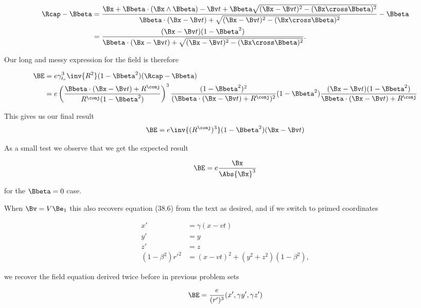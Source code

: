 \begin{align*}
\Rcap - \Bbeta &= 
\frac{\Bx + \Bbeta \cdot (\Bx \wedge \Bbeta) - \Bv t + \Bbeta \sqrt{ (\Bx - \Bv t)^2 - (\Bx \cross \Bbeta)^2 }}{ 
\Bbeta \cdot (\Bx - \Bv t) + \sqrt{ (\Bx - \Bv t)^2 - (\Bx \cross \Bbeta)^2 } 
} - \Bbeta \\
&=
\frac{(\Bx - \Bv t)(1 -\Bbeta^2)}{
\Bbeta \cdot (\Bx - \Bv t) + \sqrt{ (\Bx - \Bv t)^2 - (\Bx \cross \Bbeta)^2 } 
}.
\end{align*}

Our long and messy expression for the field is therefore

\begin{align*}
\BE &=
e \gamma_{t_r}^3 \inv{R^2} (1 - \Bbeta^2)(\Rcap - \Bbeta) \\
&=
e 
\left( 
\frac{\Bbeta \cdot (\Bx - \Bv t) + R^\conj}{R^\conj(1 - \Bbeta^2)}
\right)^3
\frac{(1 - \Bbeta^2)^2 }{ (\Bbeta \cdot (\Bx - \Bv t) + R^\conj)^2 } 
(1 -\Bbeta^2)
\frac{(\Bx - \Bv t)(1 -\Bbeta^2)}{
\Bbeta \cdot (\Bx - \Bv t) + R^\conj
} \\
\end{align*}

This gives us our final result
\begin{equation}\label{eqn:relElectroDynProblemSet5:980}
\BE =
e \inv{(R^\conj)^3}
(1 -\Bbeta^2)
(\Bx - \Bv t)
\end{equation}

As a small test we observe that we get the expected result

\begin{equation}\label{eqn:relElectroDynProblemSet5:820}
\BE = e \frac{\Bx}{\Abs{\Bx}^3}
\end{equation}

for the $\Bbeta = 0$ case.

When $\Bv = V \Be_1$ this also recovers equation (38.6) from the text as desired, and if we switch to primed coordinates

\begin{align}\label{eqn:relElectroDynProblemSet5:840}
x' &= \gamma( x - v t) \\
y' &= y \\
z' &= z \\
(1 - \beta^2) {r'}^2 &= (x - v t)^2 + (y^2 + z^2)(1 - \beta^2),
\end{align}

we recover the field equation derived twice before in previous problem sets

\begin{equation}\label{eqn:relElectroDynProblemSet5:1000}
\BE = \frac{e}{(r')^3} ( x', \gamma y', \gamma z')
\end{equation}

